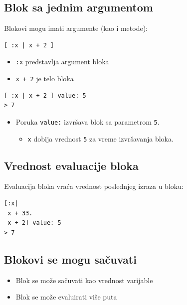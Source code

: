 \documentclass[presentation]{beamer}
\begin{document}
\subsection{Blok sa jednim argumentom}
\label{sec:orgb38b62e}

Blokovi mogu imati argumente (kao i metode):

\begin{verbatim}
[ :x | x + 2 ]
\end{verbatim}

\begin{itemize}
\item \texttt{:x} predstavlja argument bloka
\item \texttt{x + 2} je telo bloka
\end{itemize}

\begin{verbatim}
[ :x | x + 2 ] value: 5
> 7
\end{verbatim}

\begin{itemize}
\item Poruka \texttt{value:} izvršava blok sa parametrom \texttt{5}.
\begin{itemize}
\item \texttt{x} dobija vrednost \texttt{5} za vreme izvršavanja bloka.
\end{itemize}
\end{itemize}

\subsection{Vrednost evaluacije bloka}
\label{sec:org5d1d189}

Evaluacija bloka vraća vrednost poslednjeg izraza u bloku:

\begin{verbatim}
[:x|
 x + 33.
 x + 2] value: 5
> 7
\end{verbatim}

\subsection{Blokovi se mogu sačuvati}
\label{sec:org6f423a8}

\begin{itemize}
\item Blok se može sačuvati kao vrednost varijable
\item Blok se može evaluirati više puta
\end{itemize}
\end{document}
